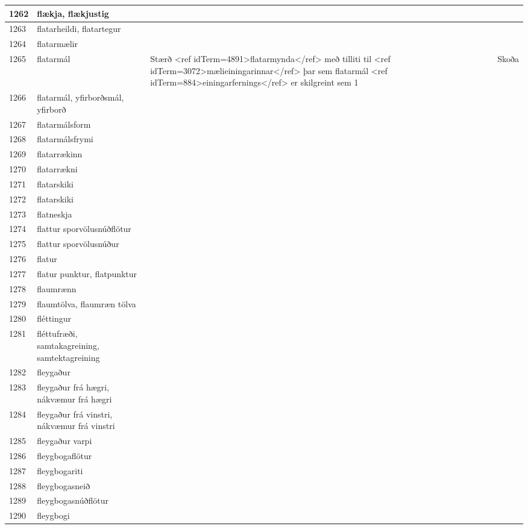 \begin{longtable}{p{}|p{}|p{}|p{}|p{}}
\hline
1262 & flækja, flækjustig &  &  &  \\
\hline
1263 & flatarheildi, flatartegur &  &  &  \\
\hline
1264 & flatarmælir &  &  &  \\
\hline
1265 & flatarmál & Stærð <ref idTerm=4891>flatarmynda</ref> með tilliti til <ref idTerm=3072>mælieiningarinnar</ref> þar sem flatarmál <ref idTerm=884>einingarfernings</ref> er skilgreint sem 1 &  & Skoða \\
\hline
1266 & flatarmál, yfirborðsmál, yfirborð &  &  &  \\
\hline
1267 & flatarmálsform &  &  &  \\
\hline
1268 & flatarmálsfrymi &  &  &  \\
\hline
1269 & flatarrækinn &  &  &  \\
\hline
1270 & flatarrækni &  &  &  \\
\hline
1271 & flatarskiki &  &  &  \\
\hline
1272 & flatarskiki &  &  &  \\
\hline
1273 & flatneskja &  &  &  \\
\hline
1274 & flattur sporvölusnúðflötur &  &  &  \\
\hline
1275 & flattur sporvölusnúður &  &  &  \\
\hline
1276 & flatur &  &  &  \\
\hline
1277 & flatur punktur, flatpunktur &  &  &  \\
\hline
1278 & flaumrænn &  &  &  \\
\hline
1279 & flaumtölva, flaumræn tölva &  &  &  \\
\hline
1280 & fléttingur &  &  &  \\
\hline
1281 & fléttufræði, samtakagreining, samtektagreining &  &  &  \\
\hline
1282 & fleygaður &  &  &  \\
\hline
1283 & fleygaður frá hægri, nákvæmur frá hægri &  &  &  \\
\hline
1284 & fleygaður frá vinstri, nákvæmur frá vinstri &  &  &  \\
\hline
1285 & fleygaður varpi &  &  &  \\
\hline
1286 & fleygbogaflötur &  &  &  \\
\hline
1287 & fleygbogariti &  &  &  \\
\hline
1288 & fleygbogasneið &  &  &  \\
\hline
1289 & fleygbogasnúðflötur &  &  &  \\
\hline
1290 & fleygbogi &  &  &  \\

\end{longtable}
